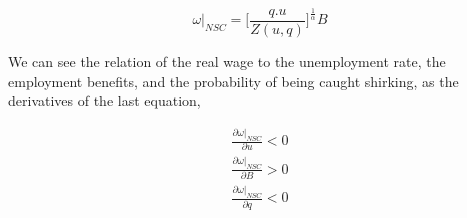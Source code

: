 \begin{equation*}
 \left. \omega \right\rvert_{NSC} = \bigg[\frac{q.u}{Z(u,q)}\bigg]^{\frac{1}{\alpha}}B 
\end{equation*}

We can see the relation of the real wage to the unemployment rate, the employment benefits, and the probability of being caught shirking, as the derivatives of the last equation, 

\begin{equation*}
    \begin{aligned}
        \frac{\partial\left. \omega \right\rvert_{NSC}}{\partial u}<0 \\
        \frac{\partial\left. \omega \right\rvert_{NSC}}{\partial B}>0 \\
        \frac{\partial\left. \omega \right\rvert_{NSC}}{\partial q}<0
    \end{aligned}
\end{equation*}

